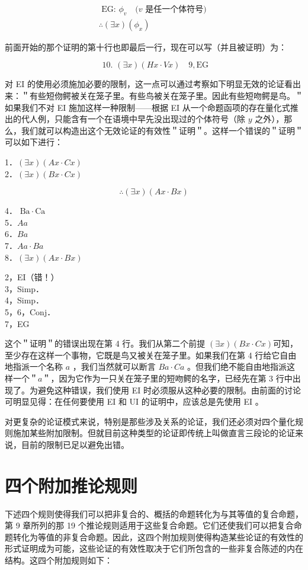 $$
\begin{gathered}
\text { EG: } \phi_{v} \quad(v \text { 是任一个体符号) } \\
\therefore(\exists x)\left(\phi_{x}\right)
\end{gathered}
$$

前面开始的那个证明的第十行也即最后一行，现在可以写（并且被证明）为：

$$
\text { 10. }(\exists x)(H x \cdot V x) \quad 9, \mathrm{EG}
$$

对 EI 的使用必须施加必要的限制，这一点可以通过考察如下明显无效的论证看出来：＂有些短伆鳄被关在笼子里。有些鸟被关在笼子里。因此有些短吻鳄是鸟。＂如果我们不对 EI 施加这样一种限制——根据 EI 从一个命题函项的存在量化式推出的代人例，只能含有一个在语境中早先没出现过的个体符号（除 $y$ 之外），那么，我们就可以构造出这个无效论证的有效性＂证明＂。这样一个错误的＂证明＂可以如下进行：

1．$(\exists x)(A x \cdot C x)$\\
2．$(\exists x)(B x \cdot C x)$

$$
\therefore(\exists x)(A x \cdot B x)
$$

4． $\mathrm{Ba} \cdot \mathrm{Ca}$\\
5．$A a$\\
6．$B a$\\
7．$A a \cdot B a$\\
8．$(\exists x)(A x \cdot B x)$

2，EI（错！）\\
3，Simp．\\
4，Simp．\\
5，6，Conj．\\
7，EG

这个＂证明＂的错误出现在第 4 行。我们从第二个前提 $(\exists x)(B x \cdot C x)$可知，至少存在这样一个事物，它既是鸟又被关在笼子里。如果我们在第 4 行给它自由地指派一个名称 $a$ ，我们当然就可以断言 $B a \cdot C a$ 。但我们绝不能自由地指派这样一个＂$a$＂，因为它作为一只关在笼子里的短吻鳄的名字，已经先在第 3 行中出现了。为避免这种错误，我们使用 EI 时必须服从这种必要的限制。由前面的讨论可明显见得：在任何要使用 EI 和 UI 的证明中，应该总是先使用 EI 。

对更复杂的论证模式来说，特别是那些涉及关系的论证，我们还必须对四个量化规则施加某些附加限制。但就目前这种类型的论证即传统上叫做直言三段论的论证来说，目前的限制已足以避免出错。

\section*{四个附加推论规则}
下述四个规则使得我们可以把非复合的、概括的命题转化为与其等值的复合命题，第 9 章所列的那 19 个推论规则适用于这些复合命题。它们还使我们可以把复合命题转化为等值的非复合命题。因此，这四个附加规则使得构造某些论证的有效性的形式证明成为可能，这些论证的有效性取决于它们所包含的一些非复合陈述的内在结构。这四个附加规则如下：


